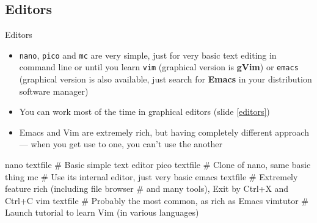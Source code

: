 \documentclass[hyperref={bookmarks=true, unicode=true, colorlinks=true, pdftitle={Linux, command line and MetaCentrum}, plainpages=false, pdfauthor={Vojtech Zeisek}, pdfsubject={Course about use of Linux command line, writing shell scripts and using MetaCentrum of CESNET}, pdfcreator={XeLaTeX, http://www.xelatex.org/}, pdfkeywords={Linux, GNU, BASH, shell, command line, MetaCentrum}, linkcolor=Sienna, anchorcolor=black, citecolor=green, filecolor=magenta, menucolor=Sienna, urlcolor=cyan, pdftex}, compress, ucs, xelatex, xcolor=svgnames, 11pt]{beamer}
\begin{document}
\subsection{Editors} 

\begin{frame}[fragile]{Editors}
\begin{itemize}
 \item \texttt{nano}, \texttt{pico} and \texttt{mc} are very simple, just for very basic text editing in command line or until you learn \texttt{vim} (graphical version is \textbf{gVim}) or \texttt{emacs} (graphical version is also available, just search for \textbf{Emacs} in your distribution software manager)
 \item You can work most of the time in graphical editors (slide \ref{editors})
 \item Emacs and Vim are extremely rich, but having completely different approach --- when you get use to one, you can't use the another
\end{itemize}
  \begin{bashcode}
    nano textfile # Basic simple text editor
    pico textfile # Clone of nano, same basic thing
    mc # Use its internal editor, just very basic
    emacs textfile # Extremely feature rich (including file browser
                   # and many tools), Exit by Ctrl+X and Ctrl+C
    vim textfile # Probably the most common, as rich as Emacs
    vimtutor # Launch tutorial to learn Vim (in various languages)
   \end{bashcode}
\end{frame}
\end{document}
